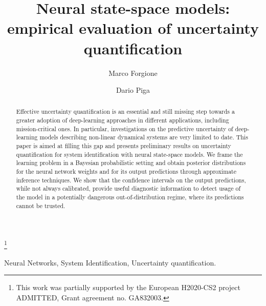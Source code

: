 \documentclass{ifacconf}
\begin{document}
\begin{frontmatter}

\title{Neural state-space models: empirical evaluation of uncertainty quantification} 

\thanks[footnoteinfo]{This work was partially supported by the European H2020-CS2 project ADMITTED, Grant agreement no. GA832003.}

\author{Marco Forgione} 
\author{Dario Piga} 

\address{IDSIA Dalle Molle Institute for Artificial Intelligence SUPSI-USI, Manno, Switzerland. (e-mail: marco.forgione@ supsi.ch; dario.piga@suspi.ch).}

\begin{abstract}                
Effective uncertainty quantification is an essential and still missing step towards a greater adoption of deep-learning approaches in 
different applications, including mission-critical ones. In particular, investigations on the predictive uncertainty of deep-learning 
models describing non-linear dynamical systems are very limited to date. This paper is aimed at filling this gap and presents preliminary results on uncertainty quantification for system identification with neural state-space models. We frame the learning problem in a Bayesian probabilistic setting 
and obtain posterior distributions for the neural network weights and for its output predictions through approximate inference techniques. We show that the confidence intervals on the output predictions, while not always calibrated, provide useful diagnostic information to detect usage of the model 
in a potentially dangerous out-of-distribution regime, where its predictions cannot be trusted.
\end{abstract}

\begin{keyword}
Neural Networks, System Identification, Uncertainty quantification.
\end{keyword}

\end{frontmatter}
\end{document}
